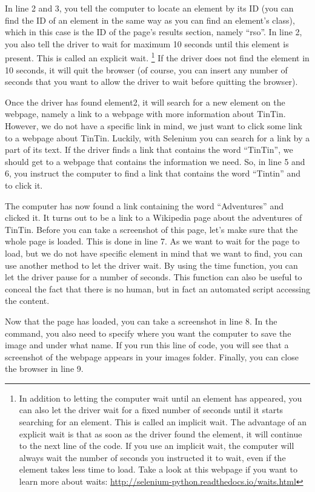 \documentclass[a4paper,12pt]{book}
\begin{document}
\begin{appendices}
In line 2 and 3, you tell the computer to locate an element by its ID (you can find the ID of an element in the same way as you can find an element’s class), which in this case is the ID of the page’s results section, namely ``rso''. In line 2, you also tell the driver to wait for maximum 10 seconds until this element is present. This is called an explicit wait.
\footnote{In addition to letting the computer wait until an element has appeared, you can also let the driver wait for a fixed number of seconds until it starts searching for an element. This is called an implicit wait. The advantage of an explicit wait is that as soon as the driver found the element, it will continue to the next line of the code. If you use an implicit wait, the computer will always wait the number of seconds you instructed it to wait, even if the element takes less time to load. Take a look at this webpage if you want to learn more about waits: \url{http://selenium-python.readthedocs.io/waits.html}}
If the driver does not find the element in 10 seconds, it will quit the browser (of course, you can insert any number of seconds that you want to allow the driver to wait before quitting the browser).  


Once the driver has found element2, it will search for a new element on the webpage, namely a link to a webpage with more information about TinTin. However, we do not have a specific link in mind, we just want to click some link to a webpage about TinTin. Luckily, with Selenium you can search for a link by a part of its text. If the driver finds a link that contains the word “TinTin”, we should get to a webpage that contains the information we need. So, in line 5 and 6, you instruct the computer to find a link that contains the word ``Tintin'' and to click it. 


The computer has now found a link containing the word ``Adventures'' and clicked it. It turns out to be a link to a Wikipedia page about the adventures of TinTin. Before you can take a screenshot of this page, let’s make sure that the whole page is loaded. This is done in line 7. As we want to wait for the page to load, but we do not have specific element in mind that we want to find, you can use another method to let the driver wait. By using the time function, you can let the driver pause for a number of seconds. This function can also be useful to conceal the fact that there is no human, but in fact an automated script accessing the content.

Now that the page has loaded, you can take a screenshot in line 8. In the command, you also need to specify where you want the computer to save the image and under what name. If you run this line of code, you will see that a screenshot of the webpage appears in your images folder. Finally, you can close the browser in line 9.  




\end{appendices}
\end{document}
